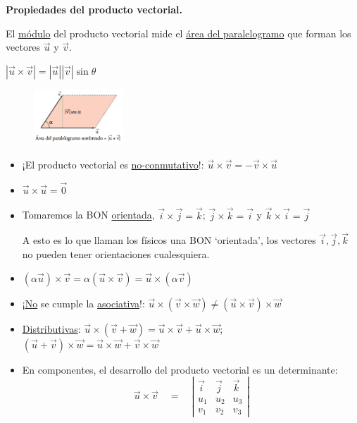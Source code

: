 \textbf{Propiedades del producto vectorial.}
\begin{multicols}{2}

El \underline{módulo} del producto vectorial mide el \underline{área del paralelogramo} que forman los vectores $\vec u$ y $\vec v$.
				
\hspace{10mm}$|\vec u \times \vec v|=|\vec u||\vec v| \sin \theta$

\begin{figure}[H]
	\centering
	\includegraphics[width=0.30\textwidth]{imagenes/imagenescv/T10IM10.png}
\end{figure}

\end{multicols}

\begin{itemize}
	\item ¡El producto vectorial es \underline{no-conmutativo}!: $\vec u \times \vec v=-\vec v \times \vec u$
	\item $\vec u \times \vec u=\vec 0$
	\item Tomaremos la BON \underline{orientada}, $\vec i \times \vec j = \vec k$; $\vec j \times \vec k = \vec i$ y $\vec k \times \vec i = \vec j$

A esto es lo que llaman los físicos una BON `orientada', los vectores $\vec i, \vec j, \vec k$ no pueden tener orientaciones cualesquiera. 	

\item $(\alpha \vec u)\times \vec v=\alpha (\vec u \times \vec v)= \vec u \times (\alpha \vec v)$
\item ¡\underline{No} se cumple la \underline{asociativa}!: $\vec u \times (\vec v \times \vec w) \neq (\vec u \times \vec v)\times \vec w$
\item \underline{Distributivas}: $\vec u \times (\vec v + \vec w)= \vec u \times \vec v + \vec u \times \vec w$; $(\vec u + \vec v)\times \vec w=\vec u \times \vec w + \vec v \times \vec w$
\item En componentes, el desarrollo del producto vectorial es un determinante:
\begin{equation}		
\boxed{ \ \overrightarrow { u } \times \overrightarrow { v } \quad =\quad \left| \begin{matrix} \overrightarrow { i }  & \overrightarrow { j }  & \overrightarrow { k }  \\ u_1 & u_2 & u_3 \\ v_1 & v_2 & v_3 \end{matrix} \right| \ }
\end{equation}
\end{itemize}
		
